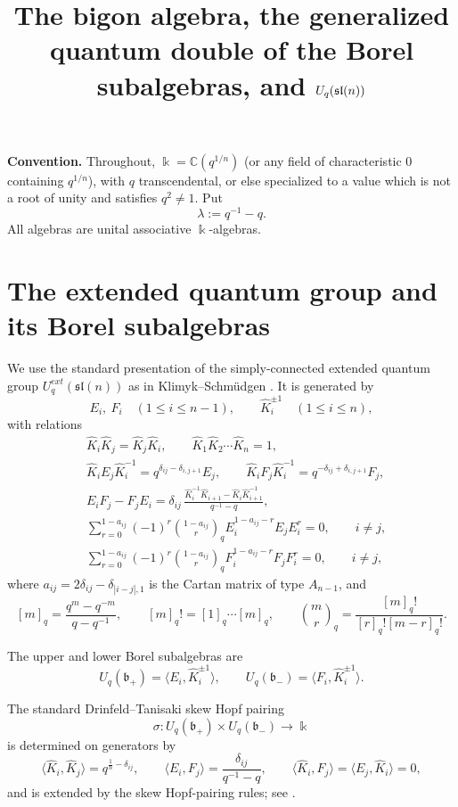 \documentclass[11pt]{article}
\title{The bigon algebra, the generalized quantum double of the Borel subalgebras, and \(U_q(\slq)\)}
\author{}
\date{}
\newcommand{\bk}{\Bbbk}
\newcommand{\fb}{\mathfrak b}
\newcommand{\slq}{\mathfrak{sl}(n)}
\newcommand{\Uq}{U_q}
\newcommand{\la}{\langle}
\newcommand{\ra}{\rangle}
\begin{document}
\maketitle

\begin{center}
\textbf{Convention.}
Throughout, \(\bk=\mathbb C(q^{1/n})\) (or any field of characteristic \(0\) containing \(q^{1/n}\)), with \(q\) transcendental, or else specialized to a value which is not a root of unity and satisfies \(q^2\neq 1\).  Put
\[
\lambda:=q^{-1}-q.
\]
All algebras are unital associative \(\bk\)-algebras.
\end{center}

\section{The extended quantum group and its Borel subalgebras}

We use the standard presentation of the simply-connected extended quantum group \(\Uq^{ext}(\slq)\) as in Klimyk--Schm\"udgen \cite{KS}.  It is generated by
\[
E_i,\ F_i\quad(1\le i\le n-1),\qquad \widehat K_i^{\pm1}\quad(1\le i\le n),
\]
with relations
\begin{align}
&\widehat K_i\widehat K_j=\widehat K_j\widehat K_i,\qquad 
\widehat K_1\widehat K_2\cdots \widehat K_n=1, \label{eq:Kprod}\\
&\widehat K_iE_j\widehat K_i^{-1}
=q^{\delta_{ij}-\delta_{i,j+1}}E_j,\qquad
\widehat K_iF_j\widehat K_i^{-1}
=q^{-\delta_{ij}+\delta_{i,j+1}}F_j, \label{eq:Kaction}\\
&E_iF_j-F_jE_i
=\delta_{ij}\,
\frac{\widehat K_i^{-1}\widehat K_{i+1}-\widehat K_i\widehat K_{i+1}^{-1}}
{q^{-1}-q}, \label{eq:EF}\\
&\sum_{r=0}^{1-a_{ij}}(-1)^r
\binom{1-a_{ij}}{r}_q
E_i^{1-a_{ij}-r}E_jE_i^r=0,\qquad i\neq j, \label{eq:SerreE}\\
&\sum_{r=0}^{1-a_{ij}}(-1)^r
\binom{1-a_{ij}}{r}_q
F_i^{1-a_{ij}-r}F_jF_i^r=0,\qquad i\neq j, \label{eq:SerreF}
\end{align}
where \(a_{ij}=2\delta_{ij}-\delta_{|i-j|,1}\) is the Cartan matrix of type \(A_{n-1}\), and
\[
[m]_q=\frac{q^m-q^{-m}}{q-q^{-1}},\qquad
[m]_q!=[1]_q\cdots[m]_q,\qquad
\binom{m}{r}_q=\frac{[m]_q!}{[r]_q![m-r]_q!}.
\]

The upper and lower Borel subalgebras are
\[
\Uq(\fb_+)=\langle E_i,\widehat K_i^{\pm1}\rangle,\qquad
\Uq(\fb_-)=\langle F_i,\widehat K_i^{\pm1}\rangle.
\]

The standard Drinfeld--Tanisaki skew Hopf pairing
\[
\sigma:\Uq(\fb_+)\times \Uq(\fb_-)\longrightarrow \bk
\]
is determined on generators by
\begin{equation}\label{eq:pairing}
\la \widehat K_i,\widehat K_j\ra=q^{\frac1n-\delta_{ij}},\qquad
\la E_i,F_j\ra=\frac{\delta_{ij}}{q^{-1}-q},\qquad
\la \widehat K_i,F_j\ra=\la E_j,\widehat K_i\ra=0,
\end{equation}
and is extended by the skew Hopf-pairing rules; see \cite[Ch.~6, 9]{KS}.
\end{document}
